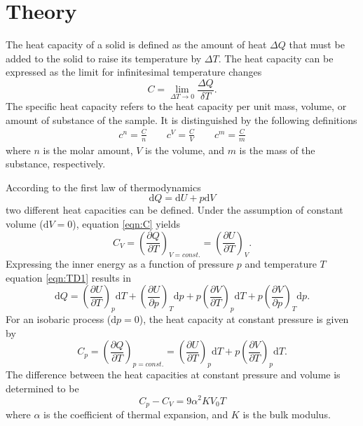 \section{Theory}
\label{sec:theory}

The heat capacity of a solid is defined as the amount of 
heat $\Delta Q$ that must be added to the solid to raise 
its temperature by $\Delta T$. 
The heat capacity can be expressed as the limit for infinitesimal 
temperature changes
\begin{equation}
    C=\lim_{\Delta T\to 0}\frac{\Delta Q}{\delta T}.
    \label{eqn:C}
\end{equation}
The specific heat capacity refers to the heat capacity per unit 
mass, volume, or amount of substance of the sample. It is 
distinguished by the following definitions
\begin{align*}
    c^n=\frac{C}{n} \qquad
    c^V=\frac{C}{V} \qquad
    c^m=\frac{C}{m}
\end{align*}
where $n$ is the molar amount, $V$ is the volume, and $m$ is 
the mass of the substance, respectively. 

According to the first law of thermodynamics
\begin{equation*}
    \text{d}Q=\text{d}U+p\text{d}V
    \label{eqn:TD1}
\end{equation*}
two different heat capacities can be defined. 
Under the assumption of constant volume ($\text{d}V=0$), 
equation \eqref{eqn:C} yields 
\begin{equation}
    C_V=\left(\frac{\partial Q}{\partial T}\right)_{V=const.}=\left(\frac{\partial U}{\partial T}\right)_V.
    \label{eqn:CV}
\end{equation}
Expressing the inner energy as a function of pressure $p$ and temperature $T$
equation \eqref{eqn:TD1} results in
\begin{equation*}
    \text{d}Q 
    =\left(\frac{\partial U}{\partial T}\right)_p \text{d} T 
    +\left(\frac{\partial U}{\partial p}\right)_T \text{d} p
    +p\left(\frac{\partial V}{\partial T}\right)_p \text{d} T
    +p\left(\frac{\partial V}{\partial p}\right)_T \text{d} p.
\end{equation*}
For an isobaric process ($\text{d}p=0$), the heat capacity at 
constant pressure is given by
\begin{equation}
    C_p=\left(\frac{\partial Q}{\partial T}\right)_{p=const.}
    =\left(\frac{\partial U}{\partial T}\right)_p \text{d} T 
    +p\left(\frac{\partial V}{\partial T}\right)_p \text{d} T.
    \label{eqn:Cp}
\end{equation}
The difference between the heat capacities at constant pressure and volume is
determined to be
\begin{equation}
    C_p-C_V=9\alpha^2KV_0T
\end{equation}
where $\alpha$ is the coefficient of thermal expansion, and $K$ is the bulk modulus. 

